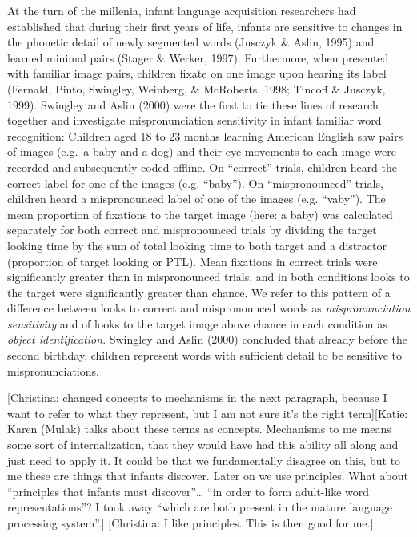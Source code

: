 \documentclass[man]{apa6}
\theoremstyle{definition}
\theoremstyle{definition}
\theoremstyle{definition}
\theoremstyle{remark}
\begin{document}
At the turn of the millenia, infant language acquisition researchers had
established that during their first years of life, infants are sensitive
to changes in the phonetic detail of newly segmented words (Jusczyk \&
Aslin, 1995) and learned minimal pairs (Stager \& Werker, 1997).
Furthermore, when presented with familiar image pairs, children fixate
on one image upon hearing its label (Fernald, Pinto, Swingley, Weinberg,
\& McRoberts, 1998; Tincoff \& Jusczyk, 1999). Swingley and Aslin (2000)
were the first to tie these lines of research together and investigate
mispronunciation sensitivity in infant familiar word recognition:
Children aged 18 to 23 months learning American English saw pairs of
images (e.g.~a baby and a dog) and their eye movements to each image
were recorded and subsequently coded offline. On \enquote{correct}
trials, children heard the correct label for one of the images (e.g.
\enquote{baby}). On \enquote{mispronounced} trials, children heard a
mispronounced label of one of the images (e.g. \enquote{vaby}). The mean
proportion of fixations to the target image (here: a baby) was
calculated separately for both correct and mispronounced trials by
dividing the target looking time by the sum of total looking time to
both target and a distractor (proportion of target looking or PTL). Mean
fixations in correct trials were significantly greater than in
mispronounced trials, and in both conditions looks to the target were
significantly greater than chance. We refer to this pattern of a
difference between looks to correct and mispronounced words as
\emph{mispronunciation sensitivity} and of looks to the target image
above chance in each condition as \emph{object identification}. Swingley
and Aslin (2000) concluded that already before the second birthday,
children represent words with sufficient detail to be sensitive to
mispronunciations.

{[}Christina: changed concepts to mechanisms in the next paragraph,
because I want to refer to what they represent, but I am not sure it's
the right term{]}{[}Katie: Karen (Mulak) talks about these terms as
concepts. Mechanisms to me means some sort of internalization, that they
would have had this ability all along and just need to apply it. It
could be that we fundamentally disagree on this, but to me these are
things that infants discover. Later on we use principles. What about
\enquote{principles that infants must discover}\ldots{} \enquote{in
order to form adult-like word representations}? I took away
\enquote{which are both present in the mature language processing
system}.{]} {[}Christina: I like principles. This is then good for
me.{]}
\end{document}
